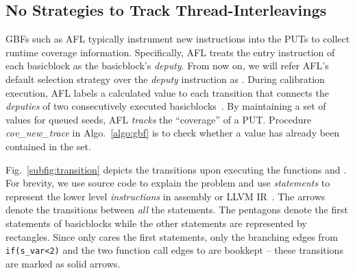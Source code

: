 \subsection{No Strategies to Track Thread-Interleavings}\label{sec:afl_issue_ins}

GBFs such as AFL typically instrument new instructions into the PUTs to collect runtime 
coverage information. Specifically, AFL treats the entry instruction of each basicblock 
as the basicblock's \emph{deputy}. From now on, we will 
refer AFL's default selection strategy over the \emph{deputy} instruction as \AFLIns. 
During calibration execution, AFL labels a calculated value to each transition that 
connects the \emph{deputies} of two consecutively executed basicblocks~\cite{afl_detail}. 
By maintaining a set of values for queued seeds, AFL \emph{tracks} the ``coverage'' 
of a PUT. Procedure \emph{cov\_new\_trace} in Algo.~\ref{algo:gbf} is to check whether a value has already been contained in the set.

Fig.~\ref{subfig:transition} depicts the transitions upon executing the functions  
and . For brevity, we use source code to explain the problem and use \emph{statements} to represent the lower level \emph{instructions} in assembly or LLVM IR~\cite{Lattner:2004:LCF:977395.977673}. The arrows denote the transitions between \emph{all} the statements. The pentagons denote the first statements of basicblocks while the other statements are 
represented by rectangles. Since \AFLIns only cares the first statements, only the branching 
edges from \texttt{{if}(s\_var<2)} and the two function call edges to  are bookkept
-- these transitions are marked as solid arrows.

